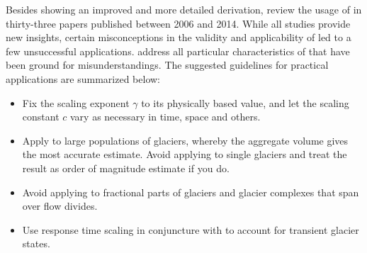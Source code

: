             Besides showing an improved and more detailed derivation, \citet{Bahr2015} review the usage of \vas{} in thirty-three papers published between 2006 and 2014. While all studies provide new insights, certain misconceptions in the validity and applicability of \vas{} led to a few unsuccessful applications. \citet[Section 8]{Bahr2015} address all particular characteristics of \vas{} that have been ground for misunderstandings. The suggested guidelines for practical applications are summarized below:
            \begin{itemize}
                \item Fix the scaling exponent $\gamma$ to its physically based value, and let the scaling constant $c$ vary as necessary in time, space and others.
                \item Apply \vas{} to large populations of glaciers, whereby the aggregate volume gives the most accurate estimate. Avoid applying \vas{} to single glaciers and treat the result as order of magnitude estimate if you do.
                \item Avoid applying \vas{} to fractional parts of glaciers and glacier complexes that span over flow divides.
                \item Use response time scaling in conjuncture with \vas{} to account for transient glacier states.
            \end{itemize}
            



